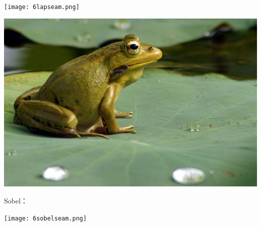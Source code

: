 \documentclass[10pt, a4paper]{article}
\begin{document}
    \texttt{[image: 6lapseam.png]}

    \includegraphics[scale = .1]{6lap.jpg}

    Sobel：

    \texttt{[image: 6sobelseam.png]}
\end{document}
